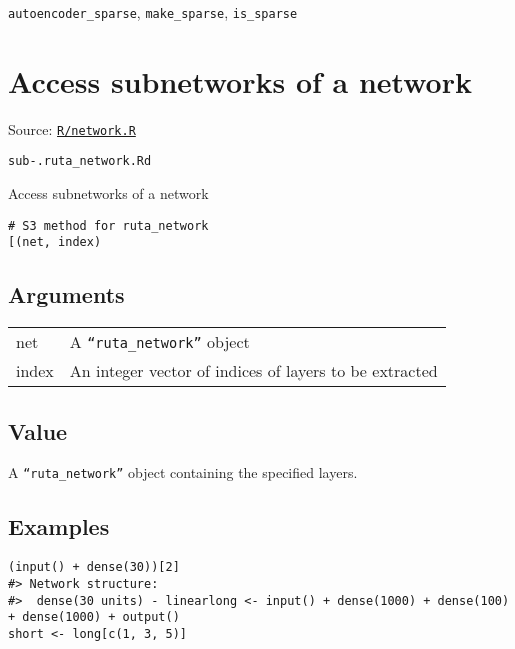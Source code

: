 \texttt{autoencoder\_sparse}, \texttt{make\_sparse}, \texttt{is\_sparse}

\section{Access subnetworks of a
network}\label{access-subnetworks-of-a-network}

Source:
\href{https://github.com/fdavidcl/ruta/blob/master/R/network.R}{\texttt{R/network.R}}

\texttt{sub-.ruta\_network.Rd}

Access subnetworks of a network

\begin{verbatim}
# S3 method for ruta_network
[(net, index)
\end{verbatim}

\hypertarget{arguments}{\subsection{\texorpdfstring{\protect\hyperlink{arguments}{}Arguments}{Arguments}}\label{arguments}}

\begin{longtable}[c]{@{}>{\small}p{3cm}>{\raggedright}p{12.5cm}@{}}
\toprule
net & A \texttt{``ruta\_network''} object\tabularnewline
index & An integer vector of indices of layers to be
extracted\tabularnewline
\bottomrule
\end{longtable}

\hypertarget{value}{\subsection{\texorpdfstring{\protect\hyperlink{value}{}Value}{Value}}\label{value}}

A \texttt{``ruta\_network''} object containing the specified layers.

\hypertarget{examples}{\subsection{\texorpdfstring{\protect\hyperlink{examples}{}Examples}{Examples}}\label{examples}}

\begin{verbatim}
(input() + dense(30))[2]
#> Network structure:
#>  dense(30 units) - linearlong <- input() + dense(1000) + dense(100) + dense(1000) + output()
short <- long[c(1, 3, 5)]
\end{verbatim}

